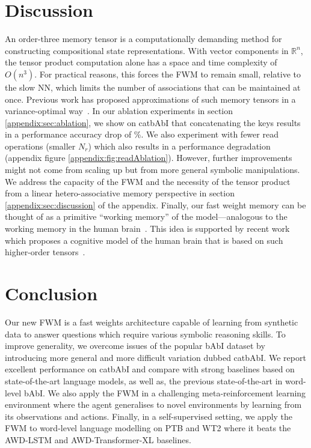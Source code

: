 \documentclass{article} \usepackage{iclr2021_conference,times}
\begin{document}
\section{Discussion}
An order-three memory tensor is a computationally demanding method for constructing compositional state representations. 
With vector components in $\mathbb{R}^n$, the tensor product computation alone has a space and time complexity of $O(n^3)$. 
For practical reasons, this forces the FWM to remain small, relative to the slow NN, which limits the number of associations that can be maintained at once. 
Previous work has proposed approximations of such memory tensors in a variance-optimal way~\citep{schlag2019enhancing}. 
In our ablation experiments in section \ref{appendix:sec:ablation}, we show on catbAbI that concatenating the keys results in a performance accuracy drop of \%.
We also experiment with fewer read operations (smaller $N_r$) which also results in a performance degradation (appendix figure \ref{appendix:fig:readAblation}).
However, further improvements might not come from scaling up but from more general symbolic manipulations. 
We address the capacity of the FWM and the necessity of the tensor product from a linear hetero-associative memory perspective in section \ref{appendix:sec:discussion} of the appendix.
Finally, our fast weight memory can be thought of as a primitive ``working memory'' of the model---analogous to the working memory in the human brain~\citep{spalding2018ventromedial}.
This idea is supported by recent work which proposes a cognitive model of the human brain that is based on such higher-order tensors~\citep{Tresp2017TheTM}. 

\section{Conclusion}
Our new FWM is a fast weights architecture capable of learning from synthetic data to answer questions which require various symbolic reasoning skills. 
To improve generality, we overcome issues of the popular bAbI dataset by introducing more general and more difficult variation dubbed catbAbI. 
We report excellent performance on catbAbI and compare with strong baselines based on state-of-the-art language models, as well as, the previous state-of-the-art in word-level bAbI. 
We also apply the FWM in a challenging meta-reinforcement learning environment where the agent generalises to novel environments by learning from its observations and actions. 
Finally, in a self-supervised setting, we apply the FWM to word-level language modelling on PTB and WT2 where it beats the AWD-LSTM and AWD-Transformer-XL baselines.
\end{document}
